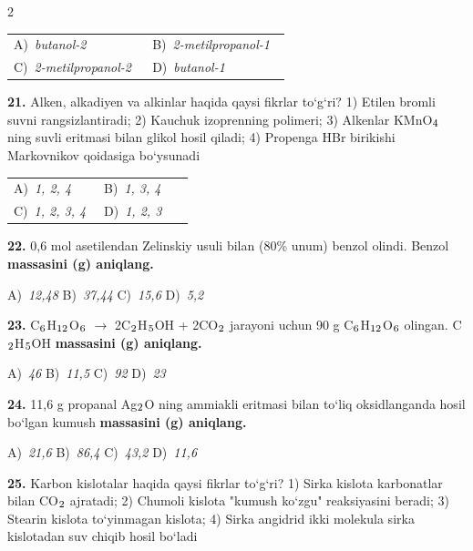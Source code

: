 \documentclass[11pt,a4paper]{article}
\renewcommand{\textsubscript}[1]{\ensuremath{_{\text{\fontsize{8}{8}\selectfont #1}}}}
\begin{document}
\begin{multicols}{2}
\noindent\begin{tabular}{@{}p{0.47\linewidth}@{}p{0.47\linewidth}@{}}
A)~\textsl{butanol-2} & B)~\textsl{2-metilpropanol-1} \\
C)~\textsl{2-metilpropanol-2} & D)~\textsl{butanol-1} \\
\end{tabular}\par
\vspace{4pt}
\noindent\textbf{21.} Alken, alkadiyen va alkinlar haqida qaysi fikrlar to`g`ri? 1) Etilen bromli suvni rangsizlantiradi; 2) Kauchuk izoprenning polimeri; 3) Alkenlar KMnO\textsubscript{4} ning suvli eritmasi bilan glikol hosil qiladi; 4) Propenga HBr birikishi Markovnikov qoidasiga bo`ysunadi

\noindent\begin{tabular}{@{}p{0.47\linewidth}@{}p{0.47\linewidth}@{}}
A)~\textsl{1, 2, 4} & B)~\textsl{1, 3, 4} \\
C)~\textsl{1, 2, 3, 4} & D)~\textsl{1, 2, 3} \\
\end{tabular}\par
\vspace{4pt}
\noindent\textbf{22.} 0,6 mol asetilendan Zelinskiy usuli bilan (80\% unum) benzol olindi. Benzol \textbf{massasini (g) aniqlang.}

\noindent A)~\textsl{12,48} \hfill B)~\textsl{37,44} \hfill C)~\textsl{15,6} \hfill D)~\textsl{5,2}\par
\vspace{4pt}
\noindent\textbf{23.} C\textsubscript{6}H\textsubscript{12}O\textsubscript{6} $\to$ 2C\textsubscript{2}H\textsubscript{5}OH + 2CO\textsubscript{2} jarayoni uchun 90 g C\textsubscript{6}H\textsubscript{12}O\textsubscript{6} olingan. C\textsubscript{2}H\textsubscript{5}OH \textbf{massasini (g) aniqlang.}

\noindent A)~\textsl{46} \hfill B)~\textsl{11,5} \hfill C)~\textsl{92} \hfill D)~\textsl{23}\par
\vspace{4pt}
\noindent\textbf{24.} 11,6 g propanal Ag\textsubscript{2}O ning ammiakli eritmasi bilan to`liq oksidlanganda hosil bo`lgan kumush \textbf{massasini (g) aniqlang.}

\noindent A)~\textsl{21,6} \hfill B)~\textsl{86,4} \hfill C)~\textsl{43,2} \hfill D)~\textsl{11,6}\par
\vspace{4pt}
\noindent\textbf{25.} Karbon kislotalar haqida qaysi fikrlar to`g`ri? 1) Sirka kislota karbonatlar bilan CO\textsubscript{2} ajratadi; 2) Chumoli kislota "kumush ko`zgu" reaksiyasini beradi; 3) Stearin kislota to`yinmagan kislota; 4) Sirka angidrid ikki molekula sirka kislotadan suv chiqib hosil bo`ladi


\end{multicols}
\end{document}
